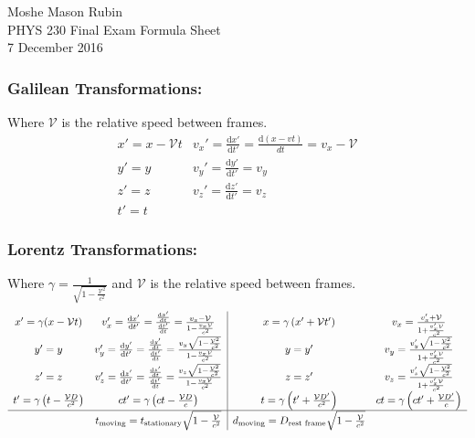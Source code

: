 \documentclass{article}
\begin{document}
		\begin{flushright}
		Moshe Mason Rubin\\PHYS 230 Final Exam Formula Sheet\\7 December 2016
	\end{flushright}
	
	\subsubsection*{Galilean Transformations:} Where $\mathcal{V}$ is the relative speed between frames.
	\[
		\begin{array}{cc}
			x'=x-\mathcal{V}t &  v_x'=\frac{\mathrm{d}x'}{\mathrm{d}t'}=\frac{\mathrm{d}\left(x-vt\right)}{dt}=v_x-\mathcal{V}\\ 
			y'=y &  v_y'=\frac{\mathrm{d}y'}{\mathrm{d}t'}=v_y\\ 
			z'=z &  v_z'=\frac{\mathrm{d}z'}{\mathrm{d}t'}=v_z\\ 
			t'=t & 
		\end{array} 
		\]
		
	\subsubsection*{Lorentz Transformations:} Where  $\gamma=\frac{1}{\sqrt{1-\frac{\mathcal{V}^2}{c^2}}}$ and $\mathcal{V}$ is the relative speed between frames. 
	\[
		\begin{array}{cc|cc}
			x'=\gamma(x-\mathcal{V}t)	&	v_x'=\frac{\mathrm{d}x'}{\mathrm{d}t'}=\frac{\frac{\mathrm{d}x'}{\mathrm{d}t}}{\frac{\mathrm{d}t'}{\mathrm{d}t}} = \frac{v_x-\mathcal{V}}{1-\frac{v_x\mathcal{V}}{c^2}}	&	x=\gamma\left(x'+\mathcal{V}t'\right)	&	v_x=\frac{v_x'+\mathcal{V}}{1+\frac{v_x'\mathcal{V}}{c^2}}\\
			y'=y	&	v_y'=\frac{\mathrm{d}y'}{\mathrm{d}t'}=\frac{\frac{\mathrm{d}y'}{\mathrm{d}t}}{\frac{\mathrm{d}t'}{\mathrm{d}t}}=\frac{v_y\sqrt{1-\frac{\mathcal{V}^2}{c^2}}}{1-\frac{v_x\mathcal{V}}{c^2}}	&	y=y'	&	v_y=\frac{v_y'\sqrt{1-\frac{\mathcal{V}^2}{c^2}}}{1+\frac{v_x'\mathcal{V}}{c^2}}\\
			z'=z	&	v_z'=\frac{\mathrm{d}z'}{\mathrm{d}t'}=\frac{\frac{\mathrm{d}z'}{\mathrm{d}t}}{\frac{\mathrm{d}t'}{\mathrm{d}t}}=\frac{v_z\sqrt{1-\frac{\mathcal{V}^2}{c^2}}}{1-\frac{v_x\mathcal{V}}{c^2}}	&	z=z'	&	v_z=\frac{v_z'\sqrt{1-\frac{\mathcal{V}^2}{c^2}}}{1+\frac{v_x'\mathcal{V}}{c^2}}\\
			t'=\gamma\left(t-\frac{\mathcal{V}D}{c^2}\right)	&	ct'=\gamma\left(ct-\frac{\mathcal{V}D}{c}\right)	&	t=\gamma\left(t'+\frac{\mathcal{V}D'}{c^2}\right)	&	ct=\gamma\left(ct'+\frac{\mathcal{V}D'}{c}\right)\\ \hline
			&	t_{\text{moving}} = t_{\text{stationary}}\sqrt{1-\frac{\mathcal{V}}{c^2}} & d_{\text{moving}} = D_{\text{rest frame}}\sqrt{1-\frac{\mathcal{V}}{c^2}}
		\end{array}
	\]%
	
\end{document}

